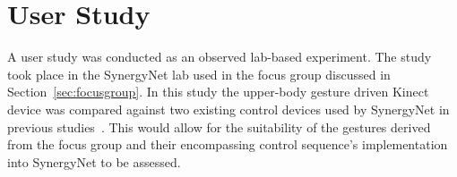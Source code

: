 \documentclass[manuscript, review, screen]{acmart}
\begin{document}

\section{User Study}
\label{sec:evaluation}

A user study was conducted as an observed lab-based experiment.
The study took place in the SynergyNet lab used in the focus group discussed in Section~\ref{sec:focusgroup}.
In this study the upper-body gesture driven Kinect device was compared against two existing control devices used by SynergyNet in previous studies~\cite{Mercier2012}.
This would allow for the suitability of the gestures derived from the focus group and their encompassing control sequence's implementation into SynergyNet to be assessed.
\end{document}
